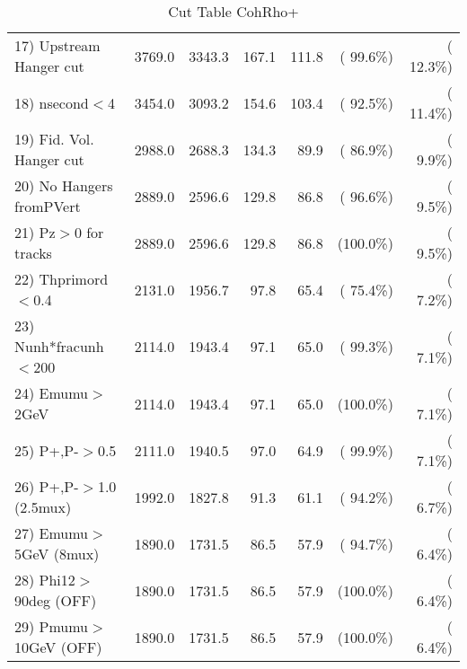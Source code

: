 \begin{table}[h!]
\begin{tabular}{||l||r|r|r|r|r|r||}
 17) Upstream Hanger cut  &       3769.0 &       3343.3 &        167.1 &        111.8 & ( 99.6\%) & ( 12.3\%) \\
 18) nsecond$<$4          &       3454.0 &       3093.2 &        154.6 &        103.4 & ( 92.5\%) & ( 11.4\%) \\
 19) Fid. Vol. Hanger cut &       2988.0 &       2688.3 &        134.3 &         89.9 & ( 86.9\%) & (  9.9\%) \\
 20) No Hangers fromPVert &       2889.0 &       2596.6 &        129.8 &         86.8 & ( 96.6\%) & (  9.5\%) \\
 21) Pz$>$0 for tracks    &       2889.0 &       2596.6 &        129.8 &         86.8 & (100.0\%) & (  9.5\%) \\
 22) Thprimord$<$0.4      &       2131.0 &       1956.7 &         97.8 &         65.4 & ( 75.4\%) & (  7.2\%) \\
 23) Nunh*fracunh$<$200   &       2114.0 &       1943.4 &         97.1 &         65.0 & ( 99.3\%) & (  7.1\%) \\
 24) Emumu$>$2GeV         &       2114.0 &       1943.4 &         97.1 &         65.0 & (100.0\%) & (  7.1\%) \\
 25) P+,P-$>$0.5          &       2111.0 &       1940.5 &         97.0 &         64.9 & ( 99.9\%) & (  7.1\%) \\
 26) P+,P-$>$1.0 (2.5mux) &       1992.0 &       1827.8 &         91.3 &         61.1 & ( 94.2\%) & (  6.7\%) \\
 27) Emumu$>$5GeV  (8mux) &       1890.0 &       1731.5 &         86.5 &         57.9 & ( 94.7\%) & (  6.4\%) \\
 28) Phi12$>$90deg  (OFF) &       1890.0 &       1731.5 &         86.5 &         57.9 & (100.0\%) & (  6.4\%) \\
 29) Pmumu$>$10GeV  (OFF) &       1890.0 &       1731.5 &         86.5 &         57.9 & (100.0\%) & (  6.4\%) \\
 \hline
 \hline
 \end{tabular}
 \caption{Cut Table  CohRho+  }
 \label{tab-cutcohjpsi-mumu_cohrhop}
 \end{table}
